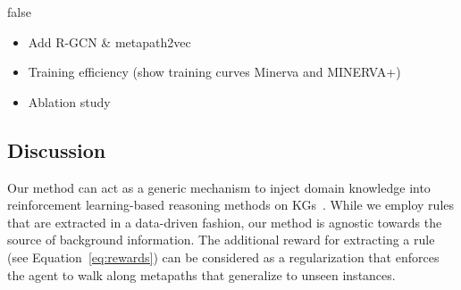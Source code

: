 \documentclass{article}
\begin{document}
 
\if false
\begin{itemize}
    \item Add R-GCN \& metapath2vec
    \item Training efficiency (show training curves Minerva and 
    MINERVA+)
    \item Ablation study
\end{itemize}
\fi
\subsection{Discussion}
\label{subsec:discussion}
Our method can act as a generic mechanism to inject domain knowledge into reinforcement learning-based reasoning methods on KGs~\cite{lin2018multi,wenhan_emnlp2017}. While we employ rules that are extracted in a data-driven fashion, our method is agnostic towards the source of background information.
The additional reward for extracting a rule (see Equation~\eqref{eq:rewards}) can be considered as a regularization that enforces the agent to walk along metapaths that generalize to unseen instances. 
\end{document}
